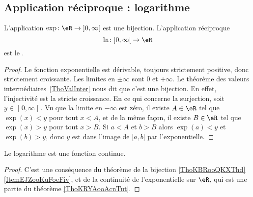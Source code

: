 \subsection{Application réciproque : logarithme}

\begin{propositionDef}    \label{DEFooELGOooGiZQjt}
    L'application \(\exp\colon \eR\to \mathopen] 0 , \infty \mathclose[\) est une bijection. L'application réciproque
    \begin{equation}
        \ln\colon \mathopen] 0 , \infty \mathclose[\to \eR
    \end{equation}
    est le .
\end{propositionDef}

\begin{proof}
Le fonction exponentielle est dérivable, toujours strictement positive, donc strictement croissante. Les limites en \( \pm \infty\) sont \( 0\) et \( +\infty\). Le théorème des valeurs intermédiaires~\ref{ThoValInter} nous dit que c'est une bijection. En effet, l'injectivité est la stricte croissance. En ce qui concerne la surjection, soit \( y\in \mathopen] 0 , \infty \mathclose[\). Vu que la limite en \( -\infty\) est zéro, il existe \( A\in \eR\) tel que \( \exp(x)<y\) pour tout \( x<A\), et de la même façon, il existe \( B\in \eR\) tel que \( \exp(x)>y\) pour tout \( x>B\). Si \( a<A\) et \( b>B\) alors \( \exp(a)<y\) et \( \exp(b)>y\), donc \( y\) est dans l'image de \( \mathopen[ a , b \mathclose]\) par l'exponentielle.
\end{proof}

\begin{lemma}        \label{LEMooCYGTooEjXEUu}
    Le logarithme est une fonction continue.
\end{lemma}

\begin{proof}
    C'est une conséquence du théorème de la bijection \ref{ThoKBRooQKXThd}\ref{ItemEJZooKuFoeFiv}, et de la continuité de l'exponentielle sur \( \eR\), qui est une partie du théorème \ref{ThoKRYAooAcnTut}.
\end{proof}

